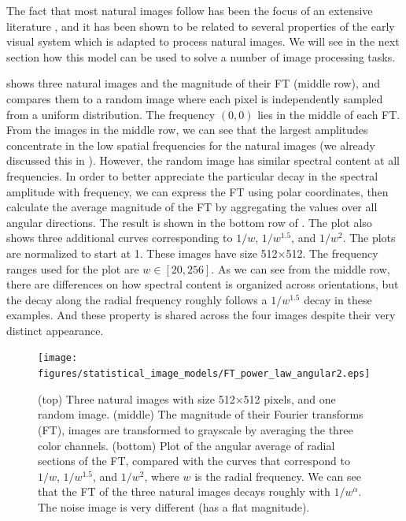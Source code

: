 The fact that most natural images follow \eqn{\ref{eq:power_law_natural_images}} has been the focus of an extensive literature \cite{Field1987,VANDERSCHAAF1996}, and it has been shown to be related to several properties of the early visual system \cite{Atick1990,Atick1992} which is adapted to process natural images. We will see in the next section how this model can be used to solve a number of image processing tasks.  


\Fig{\ref{fig:FT_angular_averages}} shows three natural images and the magnitude of their FT (middle row), and compares them to a random image where each pixel is independently sampled from a uniform distribution. The frequency $(0,0)$ lies in the middle of each FT. From the images in the middle row, we can see that the largest amplitudes concentrate in the low spatial frequencies for the natural images (we already discussed this in \chap{\ref{chapter:fourier_analysis}}). However, the random image has similar spectral content at all frequencies. In order to better appreciate the particular decay in the spectral amplitude with frequency, we can express the FT using polar coordinates, then calculate the average magnitude of the FT by aggregating the values over all angular directions.  The result is shown in the bottom row of \fig{\ref{fig:FT_angular_averages}}. The plot also shows three additional curves corresponding to $1/w$, $1/w^{1.5}$, and $1/w^2$. The plots are normalized to start at 1. These images have size 512$\times$512. The frequency ranges used for the plot are $w \in [20,256]$. As we can see from the middle row, there are differences on how spectral content is organized across orientations, but the decay along the radial frequency roughly follows a $1/w^{1.5}$ decay in these examples. And these property is shared across the four images despite their very distinct appearance. 


\begin{figure}
\centerline{
\texttt{[image: figures/statistical\_image\_models/FT\_power\_law\_angular2.eps]}
} 
\caption{(top) Three natural images with size 512$\times$512 pixels, and one random image. (middle) The magnitude of their Fourier transforms (FT), images are transformed to grayscale by averaging the three color channels. (bottom) Plot of the angular average of radial sections of the FT, compared with the curves that correspond to $1/w$, $1/w^{1.5}$, and $1/w^2$, where $w$ is the radial frequency. We can see that the FT of the three natural images decays roughly with $1/w^{\alpha}$. The noise image is very different (has a flat magnitude).
} 
\label{fig:FT_angular_averages}
\end{figure}


